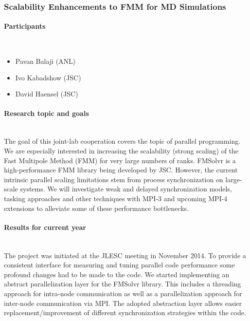 
\subsubsection{Scalability Enhancements	to FMM for MD Simulations}
\label{sec.report.ik}

\begin{refsection}[refs_ik]

\paragraph{Participants}~\\
\begin{itemize}
  \item Pavan Balaji (ANL)
  \item Ivo Kabadshow (JSC)
  \item David Haensel (JSC)
\end{itemize}

\paragraph{Research topic and goals}~\\

The goal of this joint-lab cooperation covers the topic of parallel programming. We are especially interested in increasing the scalability (strong scaling) of the Fast Multipole Method (FMM) for very large numbers of ranks. 
FMSolvr is a high-performance FMM library being developed by JSC. However, the current intrinsic parallel scaling limitations stem from process synchronization on large-scale systems. We will investigate weak and delayed synchronization models, tasking approaches and other techniques with MPI-3 and upcoming MPI-4 extensions to alleviate some of these performance bottlenecks.

\paragraph{Results for current year}~\\

The project was initiated at the JLESC meeting in November 2014. 
To provide a consistent interface for measuring and tuning parallel code performance some profound changes had to be made to the code. We started implementing an abstract parallelization layer for the FMSolvr library. This includes a threading approach for intra-node communication as well as a parallelization approach for inter-node communication via MPI. The adopted abstraction layer allows easier replacement/improvement of different synchronization strategies within the code.


\end{refsection}
